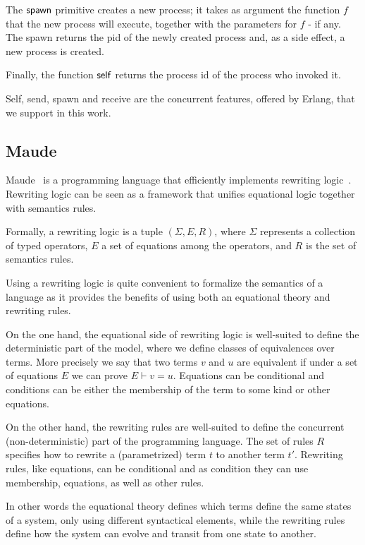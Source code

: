 \documentclass{article}[12pt,a4paper]
\theoremstyle{definition}
\begin{document}
The $\mathsf{spawn}$ primitive creates a new process; it takes as argument
the function $f$ that the new process will execute, together with the
parameters for $f$ - if any. The spawn returns the
pid of the newly created process and, as a side effect, a new process is created.

Finally, the function $\mathsf{self}$ returns the process id of the process
who invoked it.

Self, send, spawn and receive are the concurrent features, offered by Erlang, that we support in this work.

\subsection{Maude}

Maude~\cite{maude} is a programming language that efficiently implements rewriting logic~\cite{MeseguerMS96}.
Rewriting logic can be seen as a framework that unifies equational
logic together with semantics rules.

Formally, a rewriting logic is a tuple $(\Sigma, E, R)$, where $\Sigma$
represents a collection of typed operators, $E$ a set of equations among the operators, and $R$ is the set of
semantics rules.

Using a rewriting logic is quite convenient to formalize the
semantics of a language as it provides the benefits of using both an equational theory and rewriting rules.

On the one hand, the equational side of rewriting logic is well-suited to define the deterministic part of the model, where
we define classes of equivalences over terms. More precisely we say that two terms
$v$ and $u$ are equivalent if under a set of equations $E$ we can prove $E \vdash
v = u$. Equations can be conditional and conditions can be either the
membership of the term to some kind or other equations.

On the other hand, the rewriting rules are well-suited to define the concurrent
(non-deterministic) part of the programming language. The set of rules $R$
specifies how to rewrite a (parametrized) term $t$ to another term $t'$.
Rewriting rules, like equations, can be conditional and as condition they can
use membership, equations, as well as other rules.

In other words the equational theory defines which terms define the same states
of a system, only using different syntactical elements, while the rewriting rules
define how the system can evolve and transit from one state to another.
\end{document}
